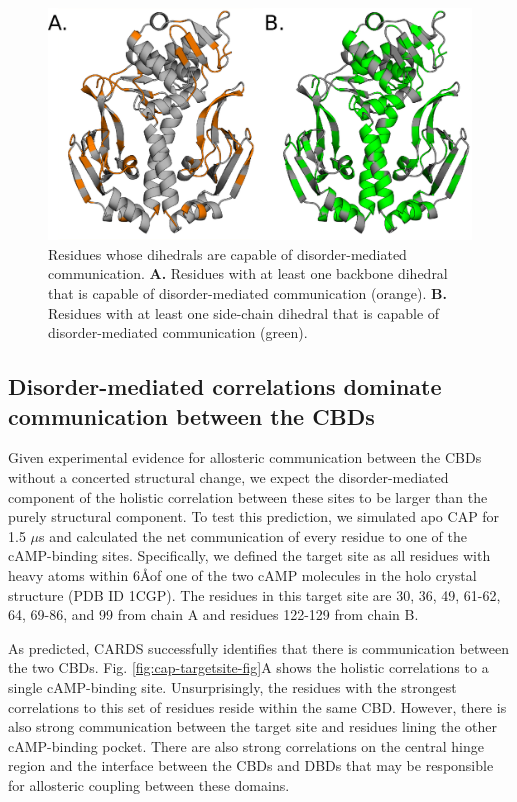 \documentclass[../main.tex]{subfiles}
\begin{document}
    \begin{figure}[!htb] %
        \centering
        \includegraphics[width=4.5in]{cap-disordered-residues-fig.eps}
        \caption[Residues whose dihedrals are capable of disorder-mediated communication.]
            {Residues whose dihedrals are capable of disorder-mediated communication. \textbf{A.} Residues with at least one backbone dihedral that is capable of disorder-mediated communication (orange). \textbf{B.} Residues with at least one side-chain dihedral that is capable of disorder-mediated communication (green).}
        \label{fig:cap-disordered-resis-fig}
    \end{figure}

    \subsection{Disorder-mediated correlations dominate communication between the CBDs}
        Given experimental evidence for allosteric communication between the CBDs without a concerted structural change\cite{Tzeng:2009im}, we expect the disorder-mediated component of the holistic correlation between these sites to be larger than the purely structural component. To test this prediction, we simulated apo CAP for 1.5 $\mu$s and calculated the net communication of every residue to one of the cAMP-binding sites. Specifically, we defined the target site as all residues with heavy atoms within 6\AA of one of the two cAMP molecules in the holo crystal structure (PDB ID 1CGP)\cite{Schultz:1991uh}. The residues in this target site are 30, 36, 49, 61-62, 64, 69-86, and 99 from chain A and residues 122-129 from chain B.

        As predicted, CARDS successfully identifies that there is communication between the two CBDs. Fig. \ref{fig:cap-targetsite-fig}A shows the holistic correlations to a single cAMP-binding site. Unsurprisingly, the residues with the strongest correlations to this set of residues reside within the same CBD. However, there is also strong communication between the target site and residues lining the other cAMP-binding pocket. There are also strong correlations on the central hinge region and the interface between the CBDs and DBDs that may be responsible for allosteric coupling between these domains.
\end{document}
